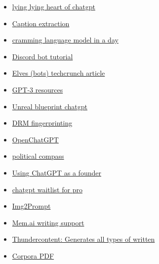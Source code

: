 \begin{itemize}
  \begin{itemize}
   
  \item
    \href{https://news.artnet.com/art-world/chatgpt-art-theory-hal-foster-2263711}{lying
    lying heart of chatgpt}
  \item
    \href{https://simonwillison.net/2022/Sep/30/action-transcription/}{Caption
    extraction}
  \item
    \href{https://arxiv.org/abs/2212.14034}{cramming language model in a
    day}
  \item
    \href{https://nlpcloud.com/build-gpt-j-gpt-neox-discord-chatbot-with-nlpcloud.html}{Discord
    bot tutorial}
  \item
    \href{https://techcrunch.com/2022/01/12/the-metaverse-will-be-filled-with-elves/}{Elves
    (bots) techcrunch article}
  \item
    \href{https://www.linkedin.com/feed/update/urn:li:activity:7005874144621809666/}{GPT-3
    resources}
  \item
    \href{https://80-lv.cdn.ampproject.org/c/s/80.lv/articles/step-by-step-instruction-on-unreal-s-blueprints-generated-with-chatgpt/?amp=1}{Unreal
    blueprint chatgpt}
  \item
    \href{https://www.newscientist.com/article/2350655-openai-is-developing-a-watermark-to-identify-work-from-its-gpt-text-ai/}{DRM
    fingerprinting}
  \item
    \href{https://github.com/LAION-AI/Open-Assistant}{OpenChatGPT}
  \item
    \href{https://www.gptoverflow.link/question/1519492600837443584/chatgpt-political-compass}{political
    compass}
  \item
    \href{https://www.atomic14.com/2022/12/05/using-chatgpt-as-a-co-founder.html}{Using
    ChatGPT as a founder}
  \item
    \href{https://docs.google.com/forms/d/e/1FAIpQLScwuQEWBkxsNftEkvUgFx2Ov7pKcrOx8IUlZ241lvet7ziXCQ/viewform?fbzx=-7085331511137611549}{chatgpt
    waitlist for pro}
  \item
    \href{https://replicate.com/methexis-inc\#}{Img2Prompt}
  \item
    \href{https://support.mem.ai/article/97-mem-x-smart-write-and-edit\#funny}{Mem.ai
    writing support}
  \item
    \href{https://thundercontent.com/features}{Thundercontent: Generates
    all types of written}
  \item
    \href{https://www.askcorpora.com/dashboard}{Corpora PDF}

\end{itemize}
\end{itemize}
